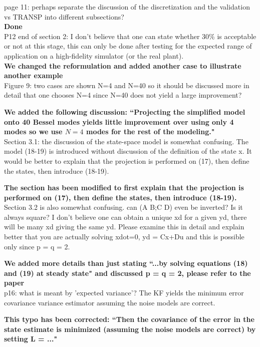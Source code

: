 \documentclass{scrartcl}
\newcommand{\response}[1]{\textcolor{red!80!black}{\bf #1}}
\begin{document}
page 11: perhaps separate the discussion of the discretization and the validation vs TRANSP into different subsections? \\
\response{Done}\\

P12 end of section 2: I don't believe that one can state whether 30\% is acceptable or not at this stage, this can only be done after testing for the expected range of application on a high-fidelity simulator (or the real plant). \\
\response{We changed the reformulation and added another case to illustrate another example}\\

Figure 9: two cases are shown N=4 and N=40 so it should be discussed more in detail that one chooses N=4 since N=40 does not yield a large improvement?

\response{We added the following discussion: ``Projecting the simplified model onto 40 Bessel modes yields little improvement over using only 4 modes so we use $N=4$ modes for the rest of the modeling."} \\

Section 3.1: the discussion of the state-space model is somewhat confusing. The model (18-19) is introduced without discussion of the definition of the state x. It would be better to explain that the projection is performed on (17), then define the states, then introduce (18-19).

\response{The section has been modified to first explain that the projection is performed on (17), then define the states, then introduce (18-19).}\\

Section 3.2 is also somewhat confusing. can (A B;C D) even be inverted? Is it always square? I don't believe one can obtain a unique xd for a given yd, there will be many xd giving the same yd. Please examine this in detail and explain better that you are actually solving xdot=0, yd = Cx+Du and this is possible only since p = q = 2.\

\response{We added more details than just stating ``...by solving equations (18) and (19) at steady state" and discussed p = q = 2, please refer to the paper}\\

p16: what is meant by 'expected variance'? The KF yields the minimum error covariance variance estimator assuming the noise models are correct.

\response{This typo has been corrected: ``Then the covariance of the error in the state estimate is minimized (assuming the noise models are correct) by setting
L = ..."}\\
\end{document}
